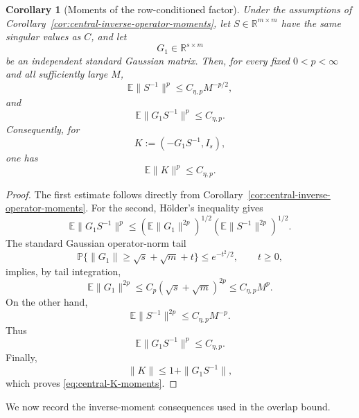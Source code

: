 \documentclass[11pt]{article}
\newtheorem{corollary}{Corollary}
\newcommand{\R}{\mathbb R}
\newcommand{\Pbb}{\mathbb P}
\newcommand{\Ebb}{\mathbb E}
\newcommand{\1}{\mathbf 1}
\begin{document}
\begin{corollary}[Moments of the row-conditioned factor]
\label{cor:row-conditioned-factor-moments}
Under the assumptions of
Corollary~\ref{cor:central-inverse-operator-moments}, let
\(S\in\R^{m\times m}\) have the same singular values as \(C\), and let
\[
        G_1\in\R^{s\times m}
\]
be an independent standard Gaussian matrix.  Then, for every fixed
\(0<p<\infty\) and all sufficiently large \(M\),
\begin{equation}
        \Ebb\|S^{-1}\|^p
        \le
        C_{\eta,p}M^{-p/2},
        \label{eq:central-S-inverse-moments}
\end{equation}
and
\begin{equation}
        \Ebb\|G_1S^{-1}\|^p
        \le
        C_{\eta,p}.
        \label{eq:central-conditioned-factor-moments}
\end{equation}
Consequently, for
\[
        K:=(-G_1S^{-1},I_s),
\]
one has
\begin{equation}
        \Ebb\|K\|^p\le C_{\eta,p}.
        \label{eq:central-K-moments}
\end{equation}
\end{corollary}

\begin{proof}
The first estimate follows directly from
Corollary~\ref{cor:central-inverse-operator-moments}.  For the second, Hölder's
inequality gives
\[
        \Ebb\|G_1S^{-1}\|^p
        \le
        \left(\Ebb\|G_1\|^{2p}\right)^{1/2}
        \left(\Ebb\|S^{-1}\|^{2p}\right)^{1/2}.
\]
The standard Gaussian operator-norm tail
\[
        \Pbb\{\|G_1\|\ge \sqrt{s}+\sqrt{m}+t\}
        \le e^{-t^2/2},
        \qquad t\ge0,
\]
implies, by tail integration,
\[
        \Ebb\|G_1\|^{2p}
        \le C_p(\sqrt{s}+\sqrt{m})^{2p}
        \le C_{\eta,p}M^p.
\]
On the other hand,
\[
        \Ebb\|S^{-1}\|^{2p}
        \le
        C_{\eta,p}M^{-p}.
\]
Thus
\[
        \Ebb\|G_1S^{-1}\|^p\le C_{\eta,p}.
\]
Finally,
\[
        \|K\|
        \le
        1+\|G_1S^{-1}\|,
\]
which proves \eqref{eq:central-K-moments}.
\end{proof}

We now record the inverse-moment consequences used in the overlap bound.
\end{document}
